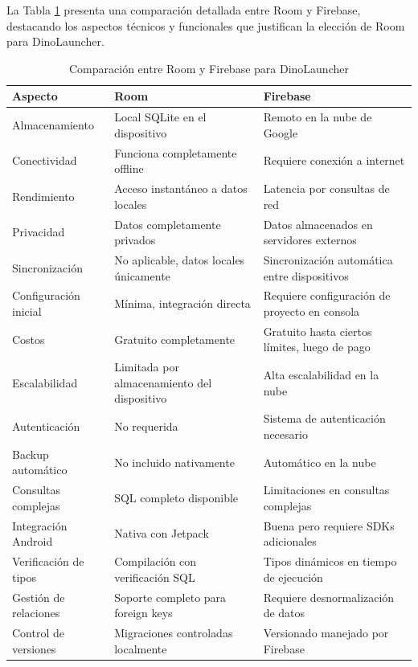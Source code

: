 La Tabla \ref{tab:comparacion_room_firebase} presenta una comparación detallada entre Room y Firebase, destacando los aspectos técnicos y funcionales que justifican la elección de Room para DinoLauncher.

\begin{table}[H]
\centering
\caption{Comparación entre Room y Firebase para DinoLauncher}
\label{tab:comparacion_room_firebase}
\begin{tabular}{|p{}|p{}|p{}|}
\hline
\textbf{Aspecto} & \textbf{Room} & \textbf{Firebase} \\
\hline
Almacenamiento & Local SQLite en el dispositivo & Remoto en la nube de Google \\
\hline
Conectividad & Funciona completamente offline & Requiere conexión a internet \\
\hline
Rendimiento & Acceso instantáneo a datos locales & Latencia por consultas de red \\
\hline
Privacidad & Datos completamente privados & Datos almacenados en servidores externos \\
\hline
Sincronización & No aplicable, datos locales únicamente & Sincronización automática entre dispositivos \\
\hline
Configuración inicial & Mínima, integración directa & Requiere configuración de proyecto en consola \\
\hline
Costos & Gratuito completamente & Gratuito hasta ciertos límites, luego de pago \\
\hline
Escalabilidad & Limitada por almacenamiento del dispositivo & Alta escalabilidad en la nube \\
\hline
Autenticación & No requerida & Sistema de autenticación necesario \\
\hline
Backup automático & No incluido nativamente & Automático en la nube \\
\hline
Consultas complejas & SQL completo disponible & Limitaciones en consultas complejas \\
\hline
Integración Android & Nativa con Jetpack & Buena pero requiere SDKs adicionales \\
\hline
Verificación de tipos & Compilación con verificación SQL & Tipos dinámicos en tiempo de ejecución \\
\hline
Gestión de relaciones & Soporte completo para foreign keys & Requiere desnormalización de datos \\
\hline
Control de versiones & Migraciones controladas localmente & Versionado manejado por Firebase \\
\hline
\end{tabular}
\end{table}

